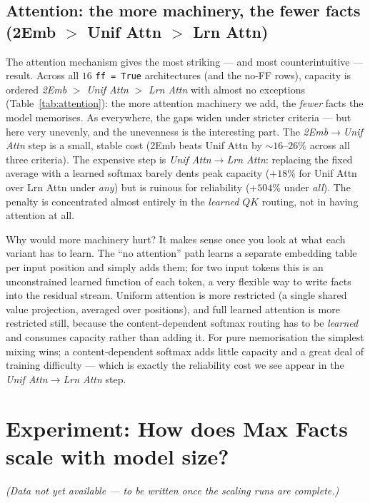 \documentclass[11pt,a4paper]{article}
\begin{document}
\subsection{Attention: the more machinery, the fewer facts (2Emb \texorpdfstring{$>$}{>} Unif Attn \texorpdfstring{$>$}{>} Lrn Attn)}

The attention mechanism gives the most striking --- and most counterintuitive --- result. Across all $16$ \texttt{ff = True} architectures (and the no-FF rows), capacity is ordered \emph{2Emb} $>$ \emph{Unif Attn} $>$ \emph{Lrn Attn} with almost no exceptions (Table~\ref{tab:attention}): the more attention machinery we add, the \emph{fewer} facts the model memorises. As everywhere, the gaps widen under stricter criteria --- but here very unevenly, and the unevenness is the interesting part. The \emph{2Emb}$\to$\emph{Unif Attn} step is a small, stable cost (2Emb beats Unif Attn by $\sim$$16$--$26\%$ across all three criteria). The expensive step is \emph{Unif Attn}$\to$\emph{Lrn Attn}: replacing the fixed average with a learned softmax barely dents peak capacity ($+18\%$ for Unif Attn over Lrn Attn under \emph{any}) but is ruinous for reliability ($+504\%$ under \emph{all}). The penalty is concentrated almost entirely in the \emph{learned} $QK$ routing, not in having attention at all.

\begin{table}
\scriptsize
\setlength{\tabcolsep}{2pt}
\centering

\caption{Pairwise comparison of the mixing variants \textbf{2E}mb / \textbf{U}nif Attn / \textbf{L}rn Attn, one row per architecture (the $16$ \texttt{ff = True} rows plus the $2$ \texttt{ff = False} rows, where only normalisation varies). For each criterion and each pair, the \textbf{X$>$Y} column counts the repeats (out of $4$) in which variant X beats variant Y (paired by repeat index; a count of $4$ is \textbf{bold}, zeros blank), and the \textbf{$\Delta$} column is the mean of $(\text{X}-\text{Y})/\text{Y}$ over the repeats, coloured \textcolor{green!55!black}{green} when positive and \textcolor{red}{red} when negative.}
\label{tab:attention}
\end{table}

Why would more machinery hurt? It makes sense once you look at what each variant has to learn. The ``no attention'' path learns a separate embedding table per input position and simply adds them; for two input tokens this is an unconstrained learned function of each token, a very flexible way to write facts into the residual stream. Uniform attention is more restricted (a single shared value projection, averaged over positions), and full learned attention is more restricted still, because the content-dependent softmax routing has to be \emph{learned} and consumes capacity rather than adding it. For pure memorisation the simplest mixing wins; a content-dependent softmax adds little capacity and a great deal of training difficulty --- which is exactly the reliability cost we see appear in the \emph{Unif Attn}$\to$\emph{Lrn Attn} step.

\section{Experiment: How does Max Facts scale with model size?}

\emph{(Data not yet available --- to be written once the scaling runs are complete.)}
\end{document}
